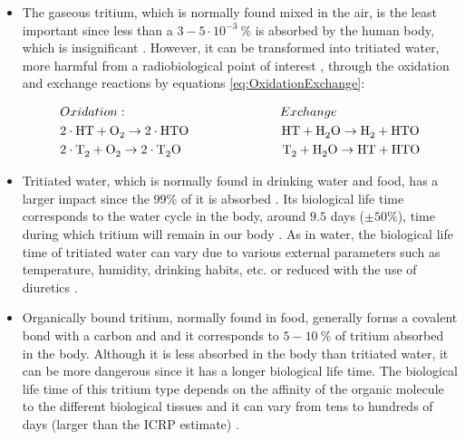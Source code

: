\begin{itemize}
\item{} The gaseous tritium, which is normally found mixed in the air, is the least important since less than a $3-5 \cdot{} 10^{-3}~\%$ is absorbed by the human body, which is insignificant \cite{TritiumHandling}. However, it can be transformed into tritiated water, more harmful from a radiobiological point of interest \cite{TritiumHandling}, through the oxidation and exchange reactions by equations \ref{eq:OxidationExchange}:

\begin{equation}
\begin{split}
& Oxidation: \qquad \qquad \qquad \qquad \qquad \qquad Exchange\\
& 2\cdot{}\ce{HT} + \ce{O_2} \rightarrow 2 \cdot{} \ce{HTO} ~ \quad \qquad \qquad \qquad \ce{HT} + \ce{H_2 O} \rightarrow \ce{H_2} + \ce{HTO}\\
& 2\cdot{}\ce{T_2} + \ce{O_2} \rightarrow 2 \cdot{} \ce{T_2 O} \qquad \qquad \qquad \qquad \ce{T_2} + \ce{H_2 O} \rightarrow \ce{HT} + \ce{HTO}
\label{eq:OxidationExchange}
\end{split}
\end{equation}

\item{} Tritiated water, which is normally found in drinking water and food, has a larger impact since the $99\%$ of it is absorbed \cite{TritiumHandling}. Its biological life time corresponds to the water cycle in the body, around $9.5$ days ($\pm50\%$), time during which tritium will remain in our body \cite{TritiumHandling, FranceTritiumEnvironment, EstimationTritiumDosi}. As in water, the biological life time of tritiated water can vary due to various external parameters such as temperature, humidity, drinking habits, etc. or reduced with the use of diuretics \cite{TritiumHandling}.

\item{} Organically bound tritium, normally found in food, generally forms a covalent bond with a carbon and and it corresponds to $5-10~\%$ of tritium absorbed in the body. Although it is less absorbed in the body than tritiated water, it can be more dangerous since it has a longer biological life time. The biological life time of this tritium type depends on the affinity of the organic molecule to the different biological tissues and it can vary from tens to hundreds of days (larger than the ICRP estimate) \cite{FranceTritiumEnvironment, EstimationTritiumDosi, EstimationTritiumDosiRats, EstimationTritiumDosiKangarooRats}.
\end{itemize}

